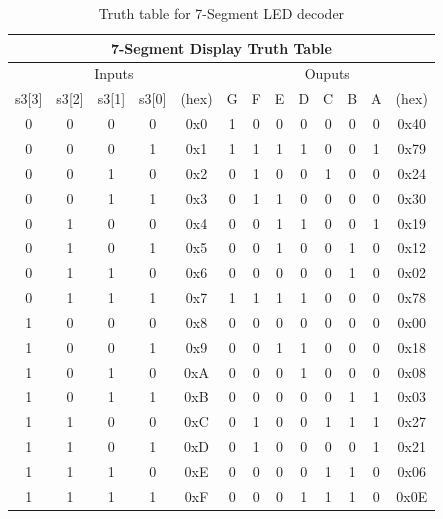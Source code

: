 \documentclass[11pt]{article}
\begin{document}
\begin{table}[h]
\centering
\begin{tabular}{|c|c|c|c|c|c|c|c|c|c|c|c|c|}
\hline
\multicolumn{13}{|c|}{\textbf{7-Segment Display Truth Table}}                                  \\ \hline
\multicolumn{5}{|c|}{Inputs}                      & \multicolumn{8}{c|}{Ouputs}       \\ \hline
s3{[}3{]} & s3{[}2{]} & s3{[}1{]} & s3{[}0{]} & (hex) & G & F & E & D & C & B & A & (hex) \\ \hline
0        & 0        & 0        & 0        & 0x0   & 1 & 0 & 0 & 0 & 0 & 0 & 0 & 0x40  \\ \hline
0        & 0        & 0        & 1        & 0x1   & 1 & 1 & 1 & 1 & 0 & 0 & 1 & 0x79  \\ \hline
0        & 0        & 1        & 0        & 0x2   & 0 & 1 & 0 & 0 & 1 & 0 & 0 & 0x24  \\ \hline
0        & 0        & 1        & 1        & 0x3   & 0 & 1 & 1 & 0 & 0 & 0 & 0 & 0x30  \\ \hline
0        & 1        & 0        & 0        & 0x4   & 0 & 0 & 1 & 1 & 0 & 0 & 1 & 0x19  \\ \hline
0        & 1        & 0        & 1        & 0x5   & 0 & 0 & 1 & 0 & 0 & 1 & 0 & 0x12  \\ \hline
0        & 1        & 1        & 0        & 0x6   & 0 & 0 & 0 & 0 & 0 & 1 & 0 & 0x02  \\ \hline
0        & 1        & 1        & 1        & 0x7   & 1 & 1 & 1 & 1 & 0 & 0 & 0 & 0x78  \\ \hline
1        & 0        & 0        & 0        & 0x8   & 0 & 0 & 0 & 0 & 0 & 0 & 0 & 0x00  \\ \hline
1        & 0        & 0        & 1        & 0x9   & 0 & 0 & 1 & 1 & 0 & 0 & 0 & 0x18  \\ \hline
1        & 0        & 1        & 0        & 0xA   & 0 & 0 & 0 & 1 & 0 & 0 & 0 & 0x08  \\ \hline
1        & 0        & 1        & 1        & 0xB   & 0 & 0 & 0 & 0 & 0 & 1 & 1 & 0x03  \\ \hline
1        & 1        & 0        & 0        & 0xC   & 0 & 1 & 0 & 0 & 1 & 1 & 1 & 0x27  \\ \hline
1        & 1        & 0        & 1        & 0xD   & 0 & 1 & 0 & 0 & 0 & 0 & 1 & 0x21  \\ \hline
1        & 1        & 1        & 0        & 0xE   & 0 & 0 & 0 & 0 & 1 & 1 & 0 & 0x06  \\ \hline
1        & 1        & 1        & 1        & 0xF   & 0 & 0 & 0 & 1 & 1 & 1 & 0 & 0x0E  \\ \hline
\end{tabular}
\caption{Truth table for 7-Segment LED decoder}
\label{table:7seg_decoder}
\end{table}
\end{document}

